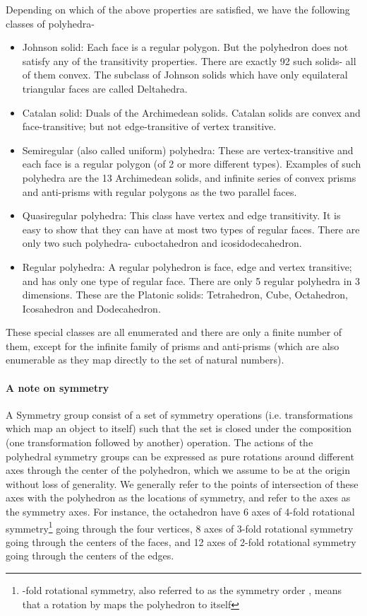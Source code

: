 \documentclass[11pt]{article}
\newcommand{\1}{\mathds{1}}
\begin{document}
Depending on which of the above properties are satisfied, we have the following classes of polyhedra-
\begin{itemize}
 \item Johnson solid: Each face is a regular polygon. But the polyhedron does not satisfy any of the transitivity properties. There are exactly 92 such solids- all of them convex. The subclass of Johnson solids which have only equilateral triangular faces are called Deltahedra.
 \item Catalan solid: Duals of the Archimedean solids. Catalan solids are convex and face-transitive; but not edge-transitive of vertex transitive.
 \item Semiregular (also called uniform) polyhedra: These are vertex-transitive and each face is a regular polygon (of 2 or more different types). Examples of such polyhedra are the 13 Archimedean solids, and infinite series of convex prisms and anti-prisms with regular polygons as the two parallel faces.
 \item Quasiregular polyhedra: This class have vertex and edge transitivity. It is easy to show that they can have at most two types of regular faces. There are only two such polyhedra- cuboctahedron and icosidodecahedron.
 \item Regular polyhedra: A regular polyhedron is face, edge and vertex transitive; and has only one type of regular face. There are only 5 regular polyhedra in 3 dimensions. These are the Platonic solids: Tetrahedron, Cube, Octahedron, Icosahedron and Dodecahedron.
\end{itemize}

These special classes are all enumerated and there are only a finite number of them, except for the infinite family of prisms and anti-prisms (which are also enumerable as they map directly to the set of natural numbers). 

\paragraph{A note on symmetry}
A Symmetry group consist of a set of symmetry operations (i.e. transformations which map an object to itself) such that the set is closed under the composition (one transformation followed by another) operation. The actions of the polyhedral symmetry groups can be expressed as pure rotations around different axes through the center of the polyhedron, which we assume to be at the origin without loss of generality. We generally refer to the points of intersection of these axes with the polyhedron as the locations of symmetry, and refer to the axes as the symmetry axes. For instance, the octahedron have 6 axes of 4-fold rotational symmetry\footnote{-fold rotational symmetry, also referred to as the symmetry order , means that a rotation by  maps the polyhedron to itself} going through the four vertices, 8 axes of 3-fold rotational symmetry going through the centers of the faces, and 12 axes of 2-fold rotational symmetry going through the centers of the edges. 
\end{document}
